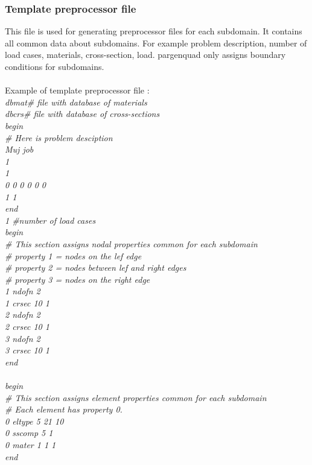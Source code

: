 \documentclass[12pt]{book}
\begin{document}
\subsubsection{Template preprocessor file}
This file is used for generating preprocessor files for each subdomain. It contains all common
data about subdomains. For example problem description, number of load cases, materials, cross-section, load.
pargenquad only assigns boundary conditions for subdomains.\\
\\
Example of template preprocessor file :\\
{\it
dbmat\#             file with database of materials\\
dbcrs\#             file with database of cross-sections\\
begin\\
\# Here is problem desciption\\
Muj job\\
1\\
1\\
0 0 0 0 0 0\\
1 1\\
end\\
1  \#number of load cases\\
begin\\
\# This section assigns nodal properties common for each subdomain\\
\# property 1 = nodes on the lef edge\\
\# property 2 = nodes between lef and right edges\\
\# property 3 = nodes on the right edge\\
1 ndofn 2\\
1 crsec 10 1\\
2 ndofn 2\\
2 crsec 10 1\\
3 ndofn 2\\
3 crsec 10 1\\
end\\
\\
begin\\
\# This section assigns element properties common for each subdomain\\
\# Each element has property 0.\\
0 eltype 5 21 10\\
0 sscomp 5 1\\
0 mater 1 1 1\\
end\\
}
\end{document}
